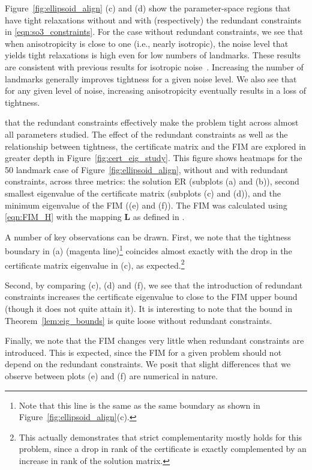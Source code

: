 \documentclass[lettersize,journal]{IEEEtran}
\newcommand{\rev}[1]{\color{red}{#1}\color{black}}
\begin{document}
Figure~\ref{fig:ellipsoid_align} (c) and (d) show the parameter-space regions that have tight relaxations without and with (respectively) the redundant constraints in \eqref{eqn:so3_constraints}. For the case without redundant constraints, we see that when anisotropicity is close to one (i.e., nearly isotropic), the noise level that yields tight relaxations is high even for low numbers of landmarks. These results are consistent with previous results for isotropic noise~\cite{holmesEfficientGlobalOptimality2023}. Increasing the number of landmarks generally improves tightness for a given noise level. We also see that for any given level of noise, increasing anisotropicity eventually results in a loss of tightness. 

\rev{We observe } that the redundant constraints effectively make the problem tight across almost all parameters studied. The effect of the redundant constraints as well as the relationship between tightness, the certificate matrix and the FIM are explored in greater depth in Figure~\ref{fig:cert_eig_study}. This figure shows heatmaps for the 50 landmark case of Figure~\ref{fig:ellipsoid_align}, without and with redundant constraints, across three metrics: the solution ER (subplots (a) and (b)), second smallest eigenvalue of the certificate matrix (subplots (c) and (d)), and the minimum eigenvalue of the FIM ((e) and (f)). The FIM was calculated using \eqref{eqn:FIM_H} with the mapping $\bm{L}$ as defined in \rev{Section \ref{sec:fim-wahba-ex}}. 

A number of key observations can be drawn. First, we note that the tightness boundary in (a) (magenta line)\footnote{Note that this line is the same as the same boundary as shown in Figure~\ref{fig:ellipsoid_align}(c).} coincides almost exactly with the drop in the certificate matrix eigenvalue in (c), as expected.\footnote{This actually demonstrates that strict complementarity mostly holds for this problem, since a drop in rank of the certificate is exactly complemented by an increase in rank of the solution matrix.} 

Second, by comparing (c), (d) and (f), we see that the introduction of redundant constraints increases the certificate eigenvalue to close to the FIM upper bound (though it does not quite attain it). It is interesting to note that the bound in Theorem~\ref{lem:eig_bounds} is quite loose without redundant constraints. 

Finally, we note that the FIM changes very little when redundant constraints are introduced. This is expected, since the FIM for a given problem should not depend on the redundant constraints. We posit that slight differences that we observe between plots (e) and (f) are numerical in nature. 
\end{document}
